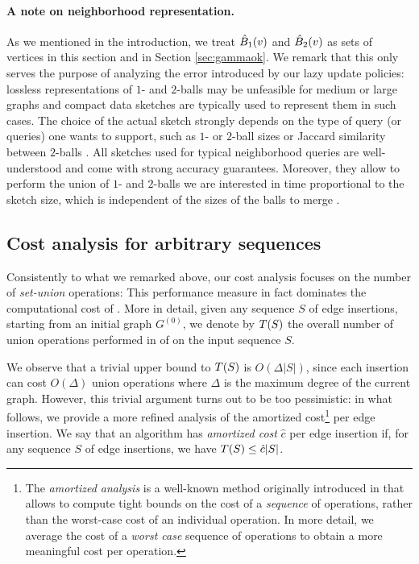 \paragraph{A note on neighborhood representation.}
As we mentioned in the introduction, we treat  $\hat{B}_1(v)$ and $\hat{B}_2(v)$ as sets of vertices in this section and in Section \ref{sec:gammaok}. We remark that this only serves the purpose of analyzing the error introduced by our lazy update policies: lossless representations of $1$- and $2$-balls may be unfeasible for medium or large graphs and compact data sketches are typically used to represent them in such cases. The choice of the actual sketch strongly depends on the type of query (or queries) one wants to support, such as $1$- or $2$-ball sizes \cite{flajolet1985probabilistic,boldi2011hyperanf} or Jaccard similarity between $2$-balls \cite{broder2000identifying,cohen2007summarizing,becchetti2008efficient}. 
All sketches used for typical neighborhood queries are well-understood and come with strong accuracy guarantees. Moreover, they allow to perform the union of $1$- and $2$-balls we are interested in time proportional to the sketch size, which is independent of the sizes of the balls to merge \cite{agarwal2013mergeable}. 

\subsection{Cost analysis for arbitrary sequences} \label{ssec:detalgo-time-wc}
Consistently to what we remarked above, our cost analysis focuses on the number of 
\emph{set-union} operations: This performance measure in fact dominates
the computational cost of .  More in detail, given any sequence $S$ of edge insertions, starting from an initial graph $G^{(0)}$,  we denote by $T(S)$ the overall number of union operations performed in  of  on the input sequence $S$.


We observe that a trivial upper bound to $T(S)$ is $O(\Delta |S|)$, since each insertion can cost $O(\Delta)$ union operations where $\Delta$ is the maximum degree of the current graph. However, this trivial argument turns out to be too pessimistic: in what follows,  we  provide a  more refined analysis of the amortized cost\footnote{The \emph{amortized analysis} is a well-known method originally introduced in \cite{Tarjan_amortized} that allows to compute tight bounds on the cost of a \textit{sequence} of operations, rather than the worst-case cost of an individual operation. In more detail,  we average the cost of a \emph{worst case} sequence of operations to obtain a more meaningful cost per operation.} per edge insertion. We say that an algorithm has \emph{amortized cost} $\hat{c}$ per edge insertion if, for any sequence $S$ of edge insertions, we have $T(S) \le \hat{c} |S|$.

